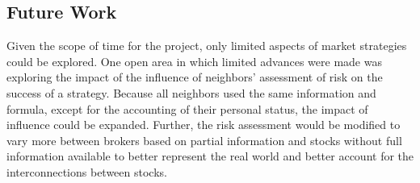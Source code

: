 \documentclass[letterpaper, 11 pt, proceedings]{IEEEtran}
\begin{document}
	\subsection{Future Work}\label{subsec:futurework}
	Given the scope of time for the project, only limited aspects of market strategies could be explored. One open area in which limited advances were made was exploring the impact of the influence of neighbors' assessment of risk on the success of a strategy. Because all neighbors used the same information and formula, except for the accounting of their personal status, the impact of influence could be expanded. Further, the risk assessment would be modified to vary more between brokers based on partial information and stocks without full information available to better represent the real world and better account for the interconnections between stocks. \par
\end{document}
